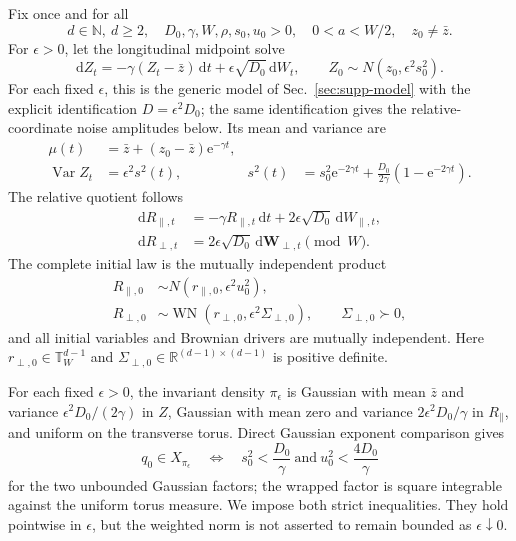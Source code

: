 \documentclass[aps,physrev,onecolumn,amsmath,amssymb,longbibliography]{revtex4-2}
\newcommand{\dd}{\mathrm d}
\newcommand{\e}{\mathrm e}
\begin{document}
Fix once and for all
\begin{equation}
 d\in\mathbb N,\ d\ge2,\quad
 D_0,\gamma,W,\rho,s_0,u_0>0,\quad
 0<a<W/2,\quad z_0\ne\bar z.
 \label{eq:fixed-direct-data}
\end{equation}
For \(\epsilon>0\), let the longitudinal midpoint solve
\begin{equation}
 \dd Z_t=-\gamma(Z_t-\bar z)\,\dd t
 +\epsilon\sqrt{D_0}\,\dd W_t,
 \qquad Z_0\sim N(z_0,\epsilon^2s_0^2).
 \label{eq:midpoint-sde}
\end{equation}
For each fixed \(\epsilon\), this is the generic model of
Sec.~\ref{sec:supp-model} with the explicit identification
\(D=\epsilon^2D_0\); the same identification gives the relative-coordinate
noise amplitudes below.
Its mean and variance are
\begin{align}
 \mu(t)&=\bar z+(z_0-\bar z)\e^{-\gamma t},
 \label{eq:midpoint-mean}\\
 \operatorname{Var}Z_t&=\epsilon^2s^2(t),
 &s^2(t)&=s_0^2\e^{-2\gamma t}
 +\frac{D_0}{2\gamma}(1-\e^{-2\gamma t}).
 \label{eq:midpoint-variance}
\end{align}
The relative quotient follows
\begin{align}
 \dd R_{\parallel,t}
 &=-\gamma R_{\parallel,t}\,\dd t
 +2\epsilon\sqrt{D_0}\,\dd W_{\parallel,t},
 \label{eq:relative-longitudinal}\\
 \dd R_{\perp,t}
 &=2\epsilon\sqrt{D_0}\,\dd\bm W_{\perp,t}\pmod W.
 \label{eq:relative-transverse}
\end{align}
The complete initial law is the mutually independent product
\begin{align}
 R_{\parallel,0}&\sim
 N(r_{\parallel,0},\epsilon^2u_0^2),
 \label{eq:initial-rparallel}\\
 R_{\perp,0}&\sim
 \operatorname{WN}(r_{\perp,0},
 \epsilon^2\Sigma_{\perp,0}),
 \qquad \Sigma_{\perp,0}\succ0,
 \label{eq:initial-rperp}
\end{align}
and all initial variables and Brownian drivers are mutually independent.  Here
\(r_{\perp,0}\in\mathbb T_W^{d-1}\) and
\(\Sigma_{\perp,0}\in\mathbb R^{(d-1)\times(d-1)}\) is positive definite.

For each fixed \(\epsilon>0\), the invariant density \(\pi_\epsilon\) is
Gaussian with mean \(\bar z\) and variance
\(\epsilon^2D_0/(2\gamma)\) in \(Z\), Gaussian with mean zero and variance
\(2\epsilon^2D_0/\gamma\) in \(R_\parallel\), and uniform on the transverse
torus.  Direct Gaussian exponent comparison gives
\begin{equation}
 q_0\in X_{\pi_\epsilon}\quad\Longleftrightarrow\quad
 s_0^2<\frac{D_0}{\gamma}
 \ \text{and}\ 
 u_0^2<\frac{4D_0}{\gamma}
 \label{eq:weighted-initial-thresholds}
\end{equation}
for the two unbounded Gaussian factors; the wrapped factor is square
integrable against the uniform torus measure.  We impose both strict
inequalities.  They hold pointwise in \(\epsilon\), but the weighted norm is
not asserted to remain bounded as \(\epsilon\downarrow0\).
\end{document}
